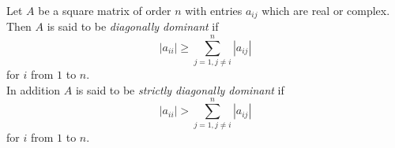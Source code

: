 \documentclass[12pt]{article}
\begin{document}
Let $A$ be a square matrix of order $n$ with entries $a_{ij}$ 
which are real or complex.  
Then $A$ is said to be \emph{diagonally dominant} if 
$$|a_{ii}| \geq \sum^n_{j=1, j\neq i} |a_{ij}|$$ 
for $i$ from $1$ to $n$.\\  
In addition $A$ is said to be \emph{strictly diagonally dominant} if 
$$|a_{ii}| > \sum^n_{j=1, j\neq i}|a_{ij}|$$
 for $i$ from $1$ to $n$.\\
\end{document}
